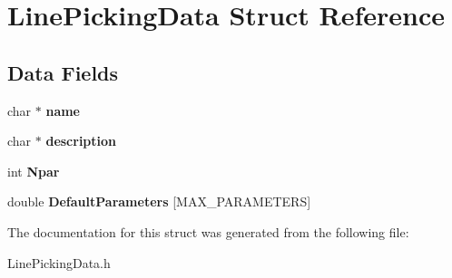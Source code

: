 \hypertarget{struct_line_picking_data}{\section{Line\-Picking\-Data Struct Reference}
\label{struct_line_picking_data}
}
\subsection*{Data Fields}
\begin{DoxyCompactItemize}
\item 
\hypertarget{struct_line_picking_data_a5ac083a645d964373f022d03df4849c8}{char $\ast$ {\bfseries name}}\label{struct_line_picking_data_a5ac083a645d964373f022d03df4849c8}

\item 
\hypertarget{struct_line_picking_data_a8444d6e0dfe2bbab0b5e7b24308f1559}{char $\ast$ {\bfseries description}}\label{struct_line_picking_data_a8444d6e0dfe2bbab0b5e7b24308f1559}

\item 
\hypertarget{struct_line_picking_data_ab3293858483aaa81751a77f58a1dfc33}{int {\bfseries Npar}}\label{struct_line_picking_data_ab3293858483aaa81751a77f58a1dfc33}

\item 
\hypertarget{struct_line_picking_data_a23df0f624b862bedf25ab3ace9685903}{double {\bfseries Default\-Parameters} \mbox{[}M\-A\-X\-\_\-\-P\-A\-R\-A\-M\-E\-T\-E\-R\-S\mbox{]}}\label{struct_line_picking_data_a23df0f624b862bedf25ab3ace9685903}

\end{DoxyCompactItemize}


The documentation for this struct was generated from the following file\-:\begin{DoxyCompactItemize}
\item 
Line\-Picking\-Data.\-h\end{DoxyCompactItemize}
